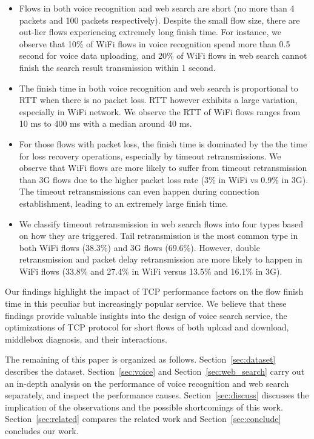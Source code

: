 

\begin{itemize}
\item Flows in both voice recognition and web search are short (no more than 4 packets and 100 packets respectively). Despite the small flow size, there are out-lier flows experiencing extremely long finish time. For instance, we observe that 10\% of WiFi flows in voice recognition spend more than 0.5 second for voice data uploading, and 20\% of WiFi flows in web search cannot finish the search result transmission within 1 second.

\item The finish time in both voice recognition and web search is proportional to RTT when there is no packet loss. RTT however exhibits a large variation, especially in WiFi network. We observe the RTT of WiFi flows ranges from 10 ms to 400 ms with a median around 40 ms. 

\item For those flows with packet loss, the finish time is dominated by the the time for loss recovery operations, especially by timeout retransmissions. We observe that WiFi flows are more likely to suffer from timeout retransmission than 3G flows due to the higher packet loss rate (3\% in WiFi vs 0.9\% in 3G). The timeout retransmissions can even happen during connection establishment, leading to an extremely large finish time.

\item We classify timeout retransmission in web search flows into four types based on how they are triggered. Tail retransmission is the most common type in both WiFi flows (38.3\%) and 3G flows (69.6\%). However, double retransmission and packet delay retransmission are more likely to happen in WiFi flows (33.8\% and 27.4\% in WiFi versus 13.5\% and 16.1\% in 3G).

\end{itemize}

Our findings highlight the impact of TCP performance factors on the flow finish time in this peculiar but increasingly popular service. We believe that these findings provide valuable insights into the design of voice search service, the optimizations of TCP protocol for short flows of both upload and download, middlebox diagnosis, and their interactions.

The remaining of this paper is organized as follows. Section~\ref{sec:dataset} describes the dataset. Section~\ref{sec:voice} and Section~\ref{sec:web_search} carry out an in-depth analysis on the performance of voice recognition and web search separately, and inspect the performance causes. Section~\ref{sec:discuss} discusses the implication of the observations and the possible shortcomings of this work. Section~\ref{sec:related} compares the related work and Section~\ref{sec:conclude} concludes our work. 
